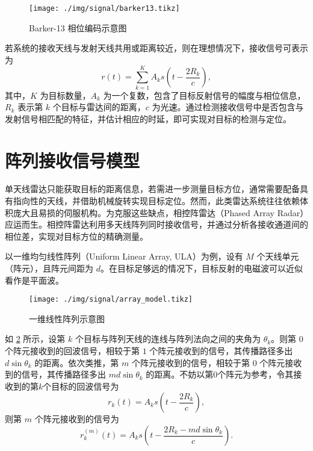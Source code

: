 \begin{figure}[htb!]
    \centering
    \texttt{[image: ./img/signal/barker13.tikz]}
    \caption{Barker-13 相位编码示意图}
    \label{fig_barker}
\end{figure}

若系统的接收天线与发射天线共用或距离较近，则在理想情况下，接收信号可表示为
\[
    r(t) = \sum_{k=1}^{K} A_k s\left(t - \frac{2 R_k}{c}\right),
\]
其中，$K$ 为目标数量，$A_k$ 为一个复数，包含了目标反射信号的幅度与相位信息，$R_k$ 表示第 $k$ 个目标与雷达间的距离，$c$ 为光速。通过检测接收信号中是否包含与发射信号相匹配的特征，并估计相应的时延，即可实现对目标的检测与定位。

\section{阵列接收信号模型}
单天线雷达只能获取目标的距离信息，若需进一步测量目标方位，通常需要配备具有指向性的天线，并借助机械旋转实现目标定位。然而，此类雷达系统往往依赖体积庞大且易损的伺服机构。为克服这些缺点，相控阵雷达（Phased Array Radar）应运而生。相控阵雷达利用多天线阵列同时接收信号，并通过分析各接收通道间的相位差，实现对目标方位的精确测量。

以一维均匀线性阵列（Uniform Linear Array, ULA）为例，设有 $M$ 个天线单元（阵元），且阵元间距为 $d$。在目标足够远的情况下，目标反射的电磁波可以近似看作是平面波。

\begin{figure}[htb!]
    \centering
    \texttt{[image: ./img/signal/array\_model.tikz]}
    \caption{一维线性阵列示意图}
    \label{fig_array}
\end{figure}

如 \cref{fig_array} 所示，设第 $k$ 个目标与阵列天线的连线与阵列法向之间的夹角为 $\theta_k$。则第 $0$ 个阵元接收到的回波信号，相较于第 $1$ 个阵元接收到的信号，其传播路径多出 $d \sin\theta_k$ 的距离。依次类推，第 $m$ 个阵元接收到的信号，相较于第 $0$ 个阵元接收到的信号，其传播路径多出 $m d \sin\theta_k$ 的距离。不妨以第0个阵元为参考，令其接收到的第\( k \)个目标的回波信号为
\[
    r_k(t) = A_k s\left(t - \frac{2 R_k}{c}\right),
\]
则第 $m$ 个阵元接收到的信号为
\[
    r_k^{(m)}(t) = A_k s\left(t - \frac{2 R_k - m d \sin\theta_k}{c}\right).
\]

